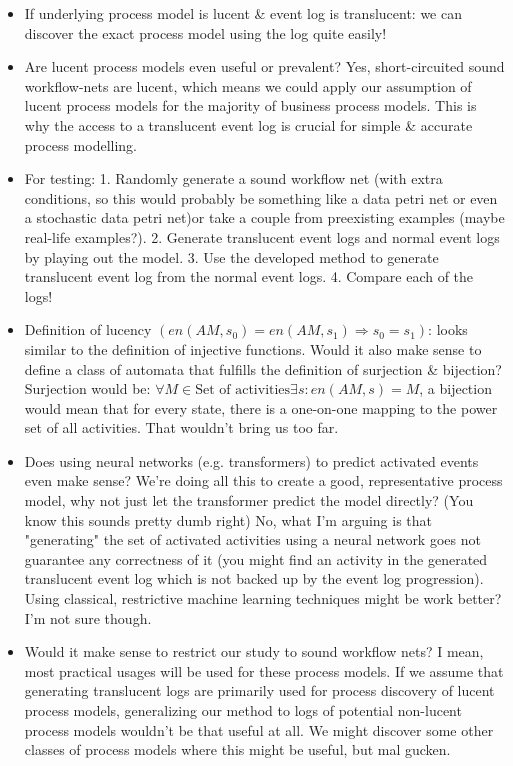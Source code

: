 \documentclass[a4paper,11pt,twoside]{pads-thesis}
\begin{document}
    \begin{itemize}
        \item If underlying process model is lucent \& event log is translucent: we can discover the exact process model using the log quite easily!
        \item Are lucent process models even useful or prevalent? Yes, short-circuited sound workflow-nets are lucent, which means we could apply our assumption of lucent process models for the majority of business process models. This is why the access to a translucent event log is crucial for simple \& accurate process modelling.
        \item For testing: 1. Randomly generate a sound workflow net (with extra conditions, so this would probably be something like a data petri net or even a stochastic data petri net)or take a couple from preexisting examples (maybe real-life examples?). 2. Generate translucent event logs and normal event logs by playing out the model. 3. Use the developed method to generate translucent event log from the normal event logs. 4. Compare each of the logs!
        \item Definition of lucency $(en(AM, s_0) = en(AM, s_1) \Rightarrow s_0 = s_1)$: looks similar to the definition of injective functions. Would it also make sense to define a class of automata that fulfills the definition of surjection \& bijection? Surjection would be: $\forall M \in \text{Set of activities} \exists s : en(AM, s) = M$, a bijection would mean that for every state, there is a one-on-one mapping to the power set of all activities. That wouldn't bring us too far.
        \item Does using neural networks (e.g. transformers) to predict  activated events even make sense? We're doing all this to create a good, representative process model, why not just let the transformer predict the model directly? (You know this sounds pretty dumb right) No, what I'm arguing is that "generating" the set of activated activities using a neural network goes not guarantee any correctness of it (you might find an activity in the generated translucent event log which is not backed up by the event log progression). Using classical, restrictive machine learning techniques might be work better? I'm not sure though.
        \item Would it make sense to restrict our study to sound workflow nets? I mean, most practical usages will be used for these process models. If we assume that generating translucent logs are primarily used for process discovery of lucent process models, generalizing our method to logs of potential non-lucent process models wouldn't be that useful at all. We might discover some other classes of process models where this might be useful, but mal gucken.

\end{itemize}
\end{document}
